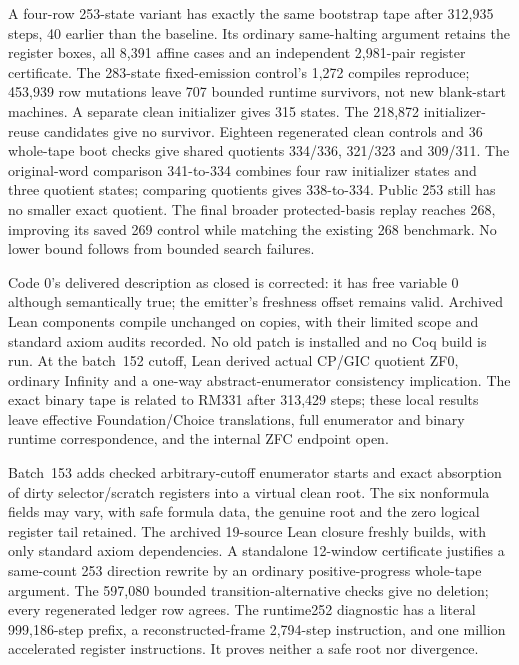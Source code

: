 \documentclass[11pt]{article}
\begin{document}
{A four-row 253-state variant has exactly the same bootstrap tape after
312,935 steps, 40 earlier than the baseline. Its ordinary same-halting
argument retains the register boxes, all 8,391 affine cases and an independent
2,981-pair register certificate. The 283-state fixed-emission control's
1,272 compiles reproduce; 453,939 row mutations leave 707 bounded runtime
survivors, not new blank-start machines. A separate clean initializer gives
315 states. The 218,872 initializer-reuse candidates give no survivor.
Eighteen regenerated clean controls and 36 whole-tape boot checks give shared
quotients 334/336, 321/323 and 309/311. The original-word comparison 341-to-334
combines four raw initializer states and three quotient states; comparing
quotients gives 338-to-334. Public 253 still has no smaller exact quotient.
The final broader protected-basis replay reaches 268, improving its saved 269
control while matching the existing 268 benchmark. No lower bound follows
from bounded search failures.

Code 0's delivered description as closed is corrected: it has free variable 0
although semantically true; the emitter's freshness offset remains valid.
Archived Lean components compile unchanged on copies, with their limited
scope and standard axiom audits recorded. No old patch is installed and no
Coq build is run. At the batch~152 cutoff, Lean derived actual CP/GIC quotient ZF0,
ordinary Infinity and a one-way abstract-enumerator consistency implication.
The exact binary tape is related to RM331 after 313,429 steps; these local
results leave effective Foundation/Choice translations, full enumerator and
binary runtime correspondence, and the internal ZFC endpoint open.

Batch~153 adds checked arbitrary-cutoff enumerator starts and exact absorption
of dirty selector/scratch registers into a virtual clean root. The six
nonformula fields may vary, with safe formula data, the genuine root and
the zero logical register tail retained. The archived 19-source Lean closure
freshly builds, with only standard axiom dependencies. A standalone
12-window certificate justifies a same-count 253 direction rewrite by an
ordinary positive-progress whole-tape argument. The 597,080 bounded
transition-alternative checks give no deletion; every regenerated ledger
row agrees. The runtime252 diagnostic has a literal 999,186-step prefix,
a reconstructed-frame 2,794-step instruction, and one million accelerated
register instructions. It proves neither a safe root nor divergence.

}
\end{document}
